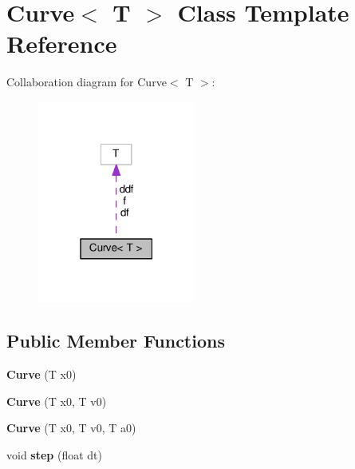 \hypertarget{class_curve}{}\section{Curve$<$ T $>$ Class Template Reference}
\label{class_curve}


Collaboration diagram for Curve$<$ T $>$\+:\nopagebreak
\begin{figure}[H]
\begin{center}
\leavevmode
\includegraphics[width=147pt]{class_curve__coll__graph}
\end{center}
\end{figure}
\subsection*{Public Member Functions}
\begin{DoxyCompactItemize}
\item 
\hypertarget{class_curve_a3d0a8e023c4f32e0a81cd649b68bbbef}{}{\bfseries Curve} (T x0)\label{class_curve_a3d0a8e023c4f32e0a81cd649b68bbbef}

\item 
\hypertarget{class_curve_ae14fb9529abb405244b78219fce1d8c5}{}{\bfseries Curve} (T x0, T v0)\label{class_curve_ae14fb9529abb405244b78219fce1d8c5}

\item 
\hypertarget{class_curve_a8f65cc108b133951735ec1dcb67aae8b}{}{\bfseries Curve} (T x0, T v0, T a0)\label{class_curve_a8f65cc108b133951735ec1dcb67aae8b}

\item 
\hypertarget{class_curve_a93867fb84d32342fec79460c64339df4}{}void {\bfseries step} (float dt)\label{class_curve_a93867fb84d32342fec79460c64339df4}

\end{DoxyCompactItemize}
